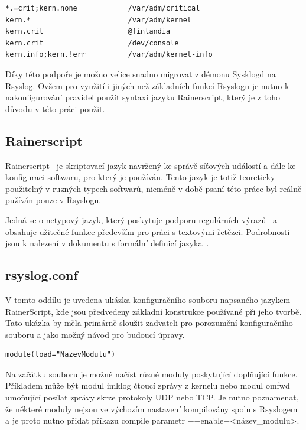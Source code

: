 \documentclass[thesis=B,czech]{FITthesis}[2012/06/26]
\begin{document}
\begin{lstlisting}[style=AshStyle]
*.=crit;kern.none            /var/adm/critical
kern.*                       /var/adm/kernel
kern.crit                    @finlandia
kern.crit                    /dev/console
kern.info;kern.!err          /var/adm/kernel-info
\end{lstlisting}

Díky této podpoře je možno velice snadno migrovat z démonu Sysklogd na Rsyslog.
Ovšem pro využití i jiných než základních funkcí Rsyslogu je nutno k nakonfigurování pravidel použít syntaxi jazyku Rainerscript, který je z toho důvodu v této práci použit.

\subsection{Rainerscript}
Rainerscript~\cite{RainerScript} je skriptovací jazyk navržený ke správě síťových událostí a dále ke konfiguraci softwaru, pro který je používán.
Tento jazyk je totiž teoreticky použitelný v ruzných typech softwarů, nicméně v době psaní této práce byl reálně pužíván pouze v Rsyslogu.

Jedná se o netypový jazyk, který poskytuje podporu regulárních výrazů~\cite{RainerScriptPropertyReplacer} a obsahuje užitečné funkce především pro práci s textovými řetězci.
Podrobnosti jsou k nalezení v dokumentu s formální definicí jazyka~\cite{RainerScriptFormalDefinition}.

\subsection{rsyslog.conf}
V tomto oddílu je uvedena ukázka konfiguračního souboru napsaného jazykem RainerScript, kde jsou předvedeny základní konstrukce používané při jeho tvorbě. Tato ukázka by měla primárně sloužit zadvateli pro porozumění konfiguračního souboru a jako možný návod pro budoucí úpravy.

\begin{lstlisting}[style=RainerScriptSimpleStyle]
module(load="NazevModulu")
\end{lstlisting}
Na začátku souboru je možné načíst různé moduly poskytující doplňující funkce. Příkladem může být modul imklog čtoucí zprávy z kernelu nebo modul omfwd umoňující posílat zprávy skrze protokoly UDP nebo TCP. Je nutno poznamenat, že některé moduly nejsou ve výchozím nastavení kompilovány spolu s Rsyslogem a je proto nutno přidat příkazu compile parametr $-$$-$enable$-$<název\_modulu>.
\end{document}

